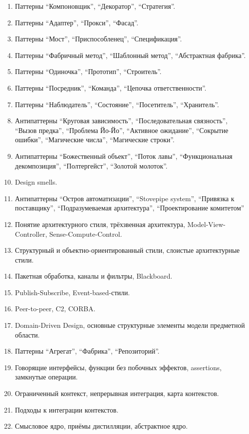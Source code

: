 \documentclass[a5paper]{article}
\begin{document}
\begin{enumerate}
	\item Паттерны ``Компоновщик'', ``Декоратор'', ``Стратегия''.
	\item Паттерны ``Адаптер'', ``Прокси'', ``Фасад''.
	\item Паттерны ``Мост'', ``Приспособленец'', ``Спецификация''.
	\item Паттерны ``Фабричный метод'', ``Шаблонный метод'', ``Абстрактная фабрика''.
	\item Паттерны ``Одиночка'', ``Прототип'', ``Строитель''.
	\item Паттерны ``Посредник'', ``Команда'', ``Цепочка ответственности''.
	\item Паттерны ``Наблюдатель'', ``Состояние'', ``Посетитель'', ``Хранитель''.
	\item Антипаттерны ``Круговая зависимость'', ``Последовательная связность'', ``Вызов предка'', ``Проблема Йо-Йо'', ``Активное ожидание'', ``Сокрытие ошибки'', ``Магические числа'', ``Магические строки''.
	\item Антипаттерны ``Божественный объект'', ``Поток лавы'', ``Функциональная декомпозиция'', ``Полтергейст'', ``Золотой молоток''.
	\item Design smells.
	\item Антипаттерны ``Остров автоматизации'', ``Stovepipe system'', ``Привязка к поставщику'', ``Подразумеваемая архитектура'', ``Проектирование комитетом''
	\item Понятие архитектурного стиля, трёхзвенная архитектура, Model-View-Controller, Sense-Compute-Control.
	\item Структурный и объектно-ориентированный стили, слоистые архитектурные стили.
	\item Пакетная обработка, каналы и фильтры, Blackboard.
	\item Publish-Subscribe, Event-based-стили.
	\item Peer-to-peer, C2, CORBA.
	\item Domain-Driven Design, основные структурные элементы модели предметной области.
	\item Паттерны ``Агрегат'', ``Фабрика'', ``Репозиторий''.
	\item Говорящие интерфейсы, функции без побочных эффектов, assertions, замкнутые операции.
	\item Ограниченный контекст, непрерывная интеграция, карта контекстов.
	\item Подходы к интеграции контекстов.
	\item Смысловое ядро, приёмы дистилляции, абстрактное ядро.

\end{enumerate}
\end{document}
